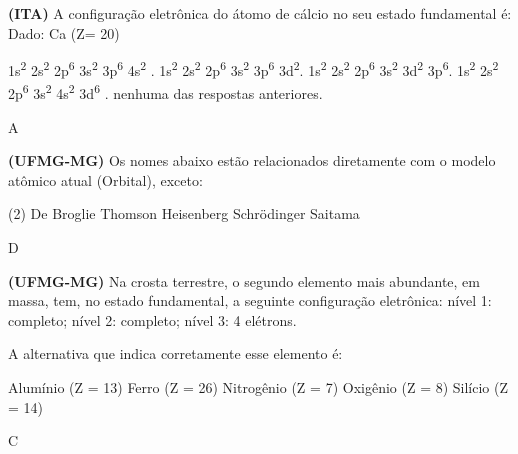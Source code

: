 \documentclass[9 pt]{scrartcl}
\def\PQ{0.84} %
\begin{document}
\begin{exercise}[points=\PQ]
\textbf{(ITA)} A configuração eletrônica do átomo de cálcio no seu estado fundamental é:
Dado: Ca (Z= 20)
\begin{choice}
\choice 1s\textsuperscript{2} 2s\textsuperscript{2} 2p\textsuperscript{6} 3s\textsuperscript{2} 3p\textsuperscript{6} 4s\textsuperscript{2} .
\choice 1s\textsuperscript{2} 2s\textsuperscript{2} 2p\textsuperscript{6} 3s\textsuperscript{2} 3p\textsuperscript{6} 3d\textsuperscript{2}.
\choice 1s\textsuperscript{2} 2s\textsuperscript{2} 2p\textsuperscript{6} 3s\textsuperscript{2} 3d\textsuperscript{2} 3p\textsuperscript{6}.
\choice 1s\textsuperscript{2} 2s\textsuperscript{2} 2p\textsuperscript{6} 3s\textsuperscript{2} 4s\textsuperscript{2} 3d\textsuperscript{6} .
\choice nenhuma das respostas anteriores.
\end{choice}
\end{exercise}
\begin{solution}
A
\end{solution}







\begin{exercise}[points=\PQ]
\textbf{(UFMG-MG)} Os nomes abaixo estão relacionados diretamente com o modelo atômico atual (Orbital), exceto:

\begin{choice}(2)
\choice De Broglie
\choice Thomson
\choice Heisenberg
\choice Schrödinger
\choice Saitama
\end{choice}
\end{exercise}
\begin{solution}
D
\end{solution}




\begin{exercise}[points=\PQ]
\textbf{(UFMG-MG)} Na crosta terrestre, o segundo elemento mais abundante, em massa, tem, no estado fundamental, a seguinte configuração eletrônica: nível 1: completo; nível 2: completo; nível 3: 4 elétrons.

A alternativa que indica corretamente esse elemento é:
\begin{choice}
\choice Alumínio (Z = 13)
\choice Ferro (Z = 26)
\choice Nitrogênio (Z = 7)
\choice Oxigênio (Z = 8)
\choice Silício (Z = 14)
\end{choice}
\end{exercise}
\begin{solution}
C
\end{solution}
\end{document}

